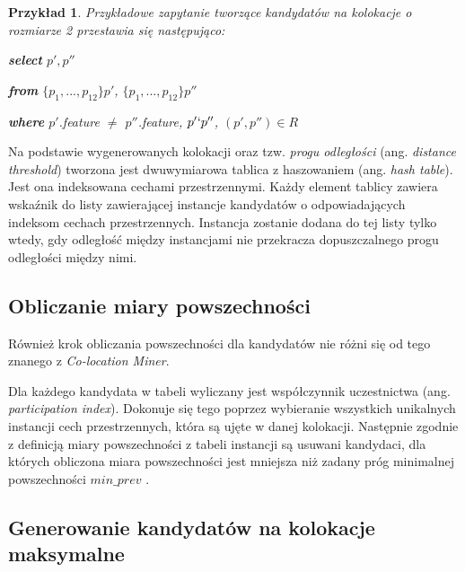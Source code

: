\documentclass[12pt]{article}
\newtheorem{sample}{Przykład}
\begin{document}
\begin{sample}Przykładowe zapytanie tworzące kandydatów na kolokacje o rozmiarze 2 przestawia się następująco:

\textbf{select} $ p', p''$

\textbf{from} $ \{p_{1},...,p_{12}\} p' $, $ \{p_{1},...,p_{12}\} p''$

\textbf{where}  $ p' $.feature $ \neq $ $ p'' $.feature, $ p' \lq p'' $, $(p', p'') \in R$
\end{sample}

Na podstawie wygenerowanych kolokacji oraz tzw. \textit{progu odległości} (ang. \textit{distance threshold}) tworzona jest dwuwymiarowa tablica z haszowaniem (ang. \textit{hash table}). Jest ona indeksowana cechami przestrzennymi. Każdy element tablicy zawiera wskaźnik do listy zawierającej instancje kandydatów o odpowiadających indeksom cechach przestrzennych. Instancja zostanie dodana do tej listy tylko wtedy, gdy odległość między instancjami nie przekracza dopuszczalnego progu odległości między nimi.


\subsection{Obliczanie miary powszechności}

Również krok obliczania powszechności dla kandydatów nie różni się od tego znanego z \textit{Co-location Miner}.

Dla każdego kandydata w tabeli wyliczany jest współczynnik uczestnictwa (ang. \textit{participation index}). Dokonuje się tego poprzez wybieranie wszystkich unikalnych instancji cech przestrzennych, która są ujęte w danej kolokacji. Następnie zgodnie z definicją miary powszechności z tabeli instancji są usuwani kandydaci, dla których obliczona miara powszechności jest mniejsza niż zadany próg minimalnej powszechności $ min\_prev $ \cite{huang}. 

\subsection{Generowanie kandydatów na kolokacje maksymalne}
\end{document}
